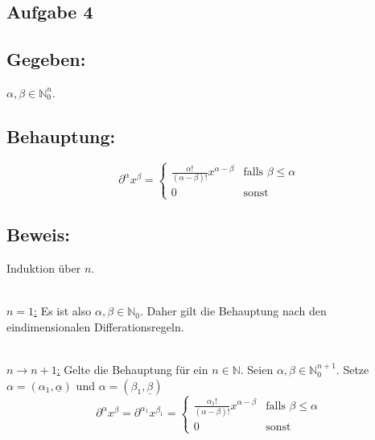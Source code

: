 \documentclass[a4paper, 12pt]{article} %
\begin{document}
\begin{flushleft}
    \QEDB

    \section*{Aufgabe 4}

    \subsection*{Gegeben:}
    $\alpha, \beta \in \mathbb{N}^n_0$.

    \subsection*{Behauptung:}
    $$
        \partial^\alpha x^\beta = \begin{cases}
            \frac{\alpha !}{(\alpha - \beta)!} x^{\alpha - \beta} & \text{falls } \beta \le \alpha \\
            0                                                     & \text{sonst}
        \end{cases}
    $$

    \subsection*{Beweis:}
    Induktion über $n$.

    \hfill\\

    \underline{$n=1$:} Es ist also $\alpha, \beta \in \mathbb{N}_0$. Daher gilt die Behauptung nach den eindimensionalen Differationsregeln.

    \hfill\\

    \underline{$n \rightarrow n+1$:} Gelte die Behauptung für ein $n \in \mathbb{N}$. Seien $\alpha, \beta \in \mathbb{N}^{n+1}_0$. Setze $\alpha = (\alpha_1,\underline{\alpha})$ und $\alpha = (\beta_1,\underline{\beta})$
    $$
        \partial^\alpha x^\beta = \partial^{\alpha_1} x^{\beta_1}
        = \begin{cases}
            \frac{\alpha_1 !}{(\alpha - \beta)!} x^{\alpha - \beta} & \text{falls } \beta \le \alpha \\
            0                                                       & \text{sonst}
        \end{cases}
    $$




\end{flushleft}
\end{document}
